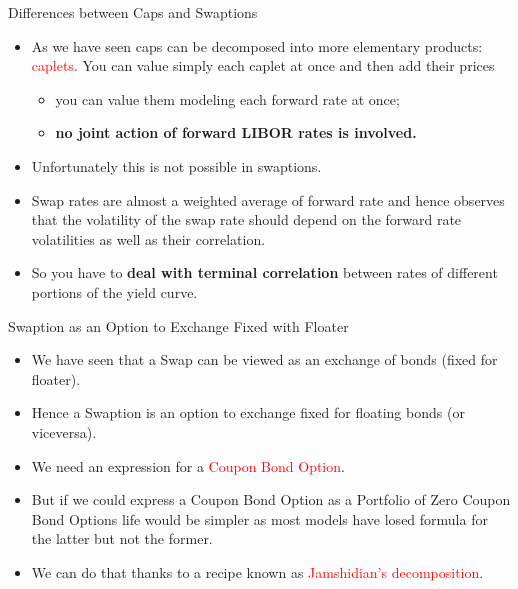 \documentclass{beamer}
\begin{document}
\begin{frame}{Differences between Caps and Swaptions}
	\begin{itemize}
		\item As we have seen caps can be decomposed into more elementary products: \textcolor{red}{caplets}. You can value simply each caplet at once and then add their prices
		\begin{itemize}
			\item you can value them modeling each forward rate at once;
			\item \textbf{no joint action of forward LIBOR rates is involved.}
		\end{itemize}
		\item Unfortunately this is not possible in swaptions.
		\item Swap rates are almost a weighted average of forward rate and hence observes that the volatility of the swap rate should depend on the forward rate volatilities as well as their correlation.
		\item So you have to \textbf{deal with terminal correlation} between rates of different portions of the yield curve. %
	\end{itemize}
\end{frame}

\begin{frame}{Swaption as an Option to Exchange Fixed with Floater}
	\begin{itemize}
		\item We have seen that a Swap can be viewed as an exchange of bonds (fixed for floater).
		\item Hence a Swaption is an option to exchange fixed for floating bonds (or viceversa).
		\item We need an expression for a \textcolor{red}{Coupon Bond Option}.
		\item But if we could express a Coupon Bond Option as a Portfolio of Zero Coupon Bond Options life would be simpler as most models have losed formula for the latter but not the former.
		\item We can do that thanks to a recipe known as \textcolor{red}{Jamshidian's decomposition}.
	\end{itemize}
\end{frame}
\end{document}
